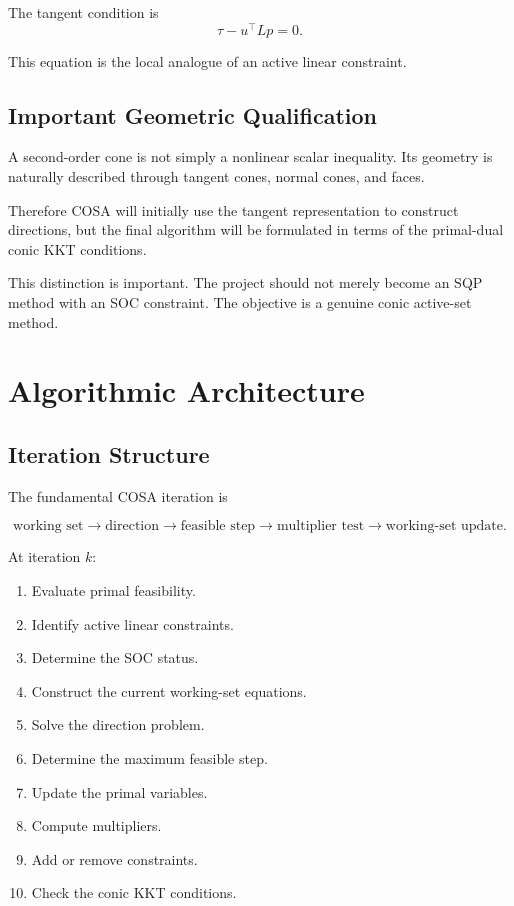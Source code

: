 \documentclass[11pt,a4paper]{article}
\begin{document}
The tangent condition is
\begin{equation}
\tau-u^\top Lp=0.
\tag{3}
\end{equation}

This equation is the local analogue of an active linear constraint.

\subsection{Important Geometric Qualification}

A second-order cone is not simply a nonlinear scalar inequality.
Its geometry is naturally described through tangent cones, normal
cones, and faces.

Therefore COSA will initially use the tangent representation to
construct directions, but the final algorithm will be formulated in
terms of the primal-dual conic KKT conditions.

This distinction is important. The project should not merely become
an SQP method with an SOC constraint. The objective is a genuine
conic active-set method.

\section{Algorithmic Architecture}

\subsection{Iteration Structure}

The fundamental COSA iteration is

\[
\boxed{
\text{working set}
\rightarrow
\text{direction}
\rightarrow
\text{feasible step}
\rightarrow
\text{multiplier test}
\rightarrow
\text{working-set update}.
}
\]

At iteration $k$:

\begin{enumerate}
    \item Evaluate primal feasibility.
    \item Identify active linear constraints.
    \item Determine the SOC status.
    \item Construct the current working-set equations.
    \item Solve the direction problem.
    \item Determine the maximum feasible step.
    \item Update the primal variables.
    \item Compute multipliers.
    \item Add or remove constraints.
    \item Check the conic KKT conditions.
\end{enumerate}
\end{document}
